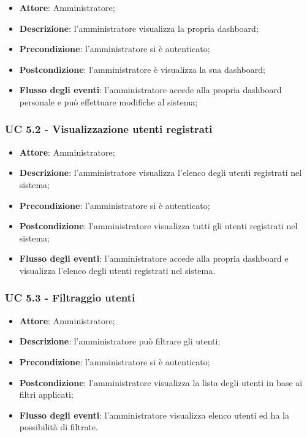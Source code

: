 \begin{itemize}
\item \textbf{Attore}: Amministratore; 
\item \textbf{Descrizione}: l'amministratore visualizza la propria dashboard;
\item \textbf{Precondizione}: l'amministratore si è autenticato;
\item \textbf{Postcondizione}: l'amministratore è visualizza la sua dashboard;
\item \textbf{Flusso degli eventi}: l'amministratore accede alla propria dashboard personale e può effettuare modifiche al sistema;
\end{itemize}

\subsubsection{UC 5.2 - Visualizzazione utenti registrati}

\begin{itemize}
\item \textbf{Attore}: Amministratore;
\item \textbf{Descrizione}: l'amministratore visualizza l'elenco degli utenti registrati nel sistema;
\item \textbf{Precondizione}: l'amministratore si è autenticato;
\item \textbf{Postcondizione}: l'amministratore visualizza tutti gli utenti registrati nel sistema;
\item \textbf{Flusso degli eventi}: l'amministratore accede alla propria dashboard e visualizza l'elenco degli utenti registrati nel sistema.
\end{itemize}

\subsubsection{UC 5.3 - Filtraggio utenti}
\begin{itemize}
\item \textbf{Attore}: Amministratore;
\item \textbf{Descrizione}: l'amministratore può filtrare gli utenti;
\item \textbf{Precondizione}: l'amministratore si è autenticato;
\item \textbf{Postcondizione}: l'amministratore visualizza la lista degli utenti in base ai filtri applicati;
\item \textbf{Flusso degli eventi}: l'amministratore visualizza elenco utenti ed ha la possibilità di filtrate.
\end{itemize}
